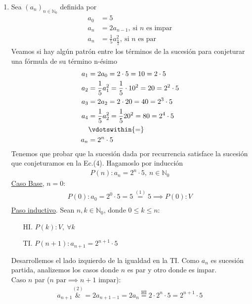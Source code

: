\begin{enumerate}[label=\roman*)]
    \item Sea $(a_n)_{n \in \mathbb{N}_0}$ definida por
    \setcounter{equation}{0}
    \begin{align}
        a_0 &= 5 \\
        a_n &= 2a_{n-1},\ \text{si $n$ es impar} \\
        a_n &= \displaystyle \frac{1}{5}a^2_{\frac{n}{2}},\ \text{si $n$ es par}    
    \end{align}
    Veamos si hay algún patrón entre los términos de la sucesión para conjeturar una fórmula de su término 
    n-ésimo
    \begin{align}
        a_1 &= 2 a_0 = 2 \cdot 5 = 10 = 2 \cdot 5 \nonumber \\
        a_2 &= \frac{1}{5} a_1^2 = \frac{1}{5} \cdot 10^2 = 20 = 2^2 \cdot 5 \nonumber \\
        a_3 &= 2 a_2 = 2 \cdot 20 = 40 = 2^3 \cdot 5 \nonumber \\
        a_4 &= \frac{1}{5} a_2^2 = \frac{1}{5} 20^2 = 80 = 2^4 \cdot 5 \nonumber \\
        &\vdotswithin{=} \nonumber \\
        a_n &= 2^n \cdot 5
    \end{align}
    Tenemos que probar que la sucesión dada por recurrencia satisface la sucesión que conjeturamos en la Ec.(4). 
    Hagamoslo por inducción
    \begin{align*}
        P(n): a_n = 2^n \cdot 5,\ n \in \mathbb{N}_0   
    \end{align*}
    \underline{Caso Base}, $n = 0$:
	\begin{align*}
		P(0): a_0 = 2^0 \cdot 5 = 5 \overset{(1)}{=} 5 \implies P(0):V \\
	\end{align*}
	\underline{Paso inductivo}. Sean $n,k \in \mathbb{N}_0$, donde $0 \leq k \leq n$:
	\begin{enumerate}
        \item[HI.] $P(k):V,\ \forall k$
        \item[TI.] $P(n+1): a_{n+1} = 2^{n+1} \cdot 5$
    \end{enumerate}
    Desarrollemos el lado izquierdo de la igualdad en la TI. Como $a_{n}$ es sucesión partida, analizemos los casos 
    donde $n$ es par y otro donde es impar. \\
    Caso $n$ par ($n \text{ par} \implies n+1 \text{ impar}$):
    \begin{align*}
  	    a_{n+1} \overset{(2)}&{=} 2 a_{n + 1 -1} = 2 a_n \overset{\text{HI}}{=} 2 \cdot 2^n \cdot 5 = 2^{n+1} \cdot 5 \\

\end{align*}
\end{enumerate}
